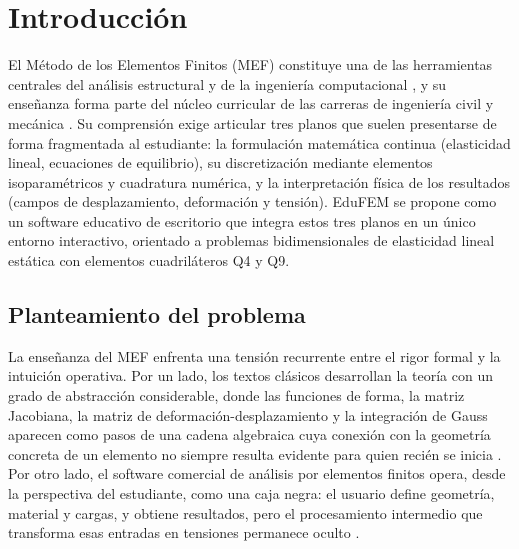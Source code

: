 \chapter*{Introducción}

El Método de los Elementos Finitos (MEF) constituye una de las herramientas centrales del análisis estructural y de la ingeniería computacional \autocite{zienkiewicz2013fem,cook2002concepts}, y su enseñanza forma parte del núcleo curricular de las carreras de ingeniería civil y mecánica \autocite{perezsantiago2023fem}. Su comprensión exige articular tres planos que suelen presentarse de forma fragmentada al estudiante: la formulación matemática continua (elasticidad lineal, ecuaciones de equilibrio), su discretización mediante elementos isoparamétricos y cuadratura numérica, y la interpretación física de los resultados (campos de desplazamiento, deformación y tensión). EduFEM se propone como un software educativo de escritorio que integra estos tres planos en un único entorno interactivo, orientado a problemas bidimensionales de elasticidad lineal estática con elementos cuadriláteros Q4 y Q9.

\section*{Planteamiento del problema}

La enseñanza del MEF enfrenta una tensión recurrente entre el rigor formal y la intuición operativa. Por un lado, los textos clásicos desarrollan la teoría con un grado de abstracción considerable, donde las funciones de forma, la matriz Jacobiana, la matriz de deformación-desplazamiento y la integración de Gauss aparecen como pasos de una cadena algebraica cuya conexión con la geometría concreta de un elemento no siempre resulta evidente para quien recién se inicia \autocite{bathe2014fem,reddy2006introduction}. Por otro lado, el software comercial de análisis por elementos finitos opera, desde la perspectiva del estudiante, como una caja negra: el usuario define geometría, material y cargas, y obtiene resultados, pero el procesamiento intermedio que transforma esas entradas en tensiones permanece oculto \autocite{perezsantiago2023fem}.

